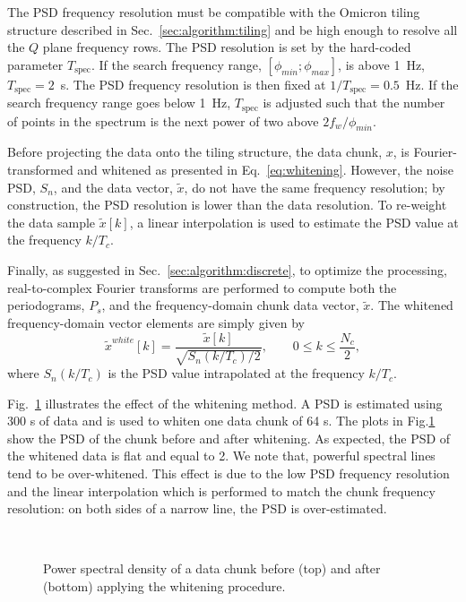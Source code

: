 The PSD frequency resolution must be compatible with the Omicron tiling structure described in Sec.~\ref{sec:algorithm:tiling} and be high enough to resolve all the $Q$ plane frequency rows. The PSD resolution is set by the hard-coded parameter $T_\mathrm{spec}$. If the search frequency range, $[\phi_{min}; \phi_{max}]$, is above 1~Hz, $T_\mathrm{spec}=2$~s. The PSD frequency resolution is then fixed at $1/T_\mathrm{spec}=0.5$~Hz. If the search frequency range goes below 1~Hz, $T_\mathrm{spec}$ is adjusted such that the number of points in the spectrum is the next power of two above $2f_w/\phi_{min}$.

Before projecting the data onto the tiling structure, the data chunk, $x$, is Fourier-transformed and whitened as presented in Eq.~\ref{eq:whitening}. However, the noise PSD, $S_n$, and the data vector, $\tilde{x}$, do not have the same frequency resolution; by construction, the PSD resolution is lower than the data resolution.  To re-weight the data sample $\tilde{x}[k]$, a linear interpolation is used to estimate the PSD value at the frequency $k/T_c$.

Finally, as suggested in Sec.~\ref{sec:algorithm:discrete}, to optimize the processing, real-to-complex Fourier transforms are performed to compute both the periodograms, $P_s$, and the frequency-domain chunk data vector, $\tilde{x}$. The whitened frequency-domain vector elements are simply given by
\begin{equation}
  \tilde{x}^{white}[k] = \frac{\tilde{x}[k]}{\sqrt{S_n(k/T_c)/2}}, \qquad 0 \le k \le \frac{N_c}{2},
  \label{eq:white_simple}
\end{equation}
where $S_n(k/T_c)$ is the PSD value intrapolated at the frequency $k/T_c$.

Fig.~\ref{fig:white} illustrates the effect of the whitening method. A PSD is estimated using 300 s of data and is used to whiten one data chunk of 64 s. The plots in Fig.\ref{fig:white} show the PSD of the chunk before and after whitening. As expected, the PSD of the whitened data is flat and equal to 2. We note that, powerful spectral lines tend to be over-whitened. This effect is due to the low PSD frequency resolution and the linear interpolation which is performed to match the chunk frequency resolution: on both sides of a narrow line, the PSD is over-estimated.
\begin{figure}
  \center
   \\
  \caption{Power spectral density of a data chunk before (top) and after (bottom) applying the whitening procedure.}
  \label{fig:white}
\end{figure}


